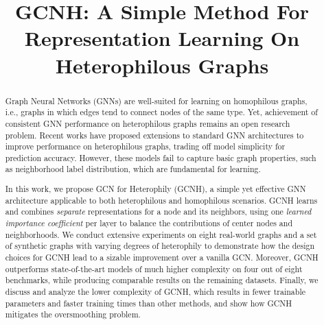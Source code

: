 \documentclass[conference]{IEEEtran}
\begin{document}
\title{GCNH: A Simple Method For Representation Learning On Heterophilous Graphs} 

\author{
}



\newcommand{\htwogcn}{H\textsubscript{2}GCN}

\maketitle

\begin{abstract}

Graph Neural Networks (GNNs) are well-suited for learning on homophilous graphs, i.e., graphs in which edges tend to connect nodes of the same type. Yet, achievement of consistent GNN performance on heterophilous graphs remains an open research problem. Recent works have proposed extensions to standard GNN architectures to improve performance on heterophilous graphs, trading off model simplicity for prediction accuracy.
However, these models fail to capture basic graph properties, such as neighborhood label distribution, which are fundamental for learning.

In this work, we propose GCN for Heterophily (GCNH), a simple yet effective GNN architecture applicable to both heterophilous and homophilous scenarios.
GCNH learns and combines \textit{separate} representations for a node and its neighbors, using one \textit{learned importance coefficient} per layer to balance the contributions of center nodes and neighborhoods. 
We conduct extensive experiments on eight real-world graphs and a set of synthetic graphs with varying degrees of heterophily to demonstrate how the design choices for GCNH lead to a sizable improvement over a vanilla GCN.
Moreover, GCNH outperforms state-of-the-art models of much higher complexity on four out of eight benchmarks, while producing comparable results on the remaining datasets.
Finally, we discuss and analyze the lower complexity of GCNH, which results in fewer trainable parameters and faster training times than other methods, and show how GCNH mitigates the oversmoothing problem.



\end{abstract}
\end{document}

